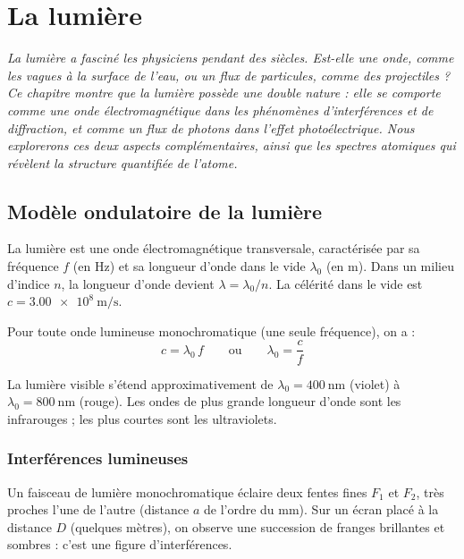 \chapter{La lumière}

\textit{La lumière a fasciné les physiciens pendant des siècles. Est-elle une onde, comme les vagues à la surface de l'eau, ou un flux de particules, comme des projectiles ? Ce chapitre montre que la lumière possède une double nature : elle se comporte comme une onde électromagnétique dans les phénomènes d'interférences et de diffraction, et comme un flux de photons dans l'effet photoélectrique. Nous explorerons ces deux aspects complémentaires, ainsi que les spectres atomiques qui révèlent la structure quantifiée de l'atome.}

\section{Modèle ondulatoire de la lumière}

\begin{definition}
La lumière est une onde électromagnétique transversale, caractérisée par sa fréquence \(f\) (en \si{\hertz}) et sa longueur d'onde dans le vide \(\lambda_0\) (en \si{\metre}). Dans un milieu d'indice \(n\), la longueur d'onde devient \(\lambda = \lambda_0 / n\). La célérité dans le vide est \(c = \SI{3.00e8}{\metre\per\second}\).
\end{definition}

\begin{loi}
Pour toute onde lumineuse monochromatique (une seule fréquence), on a :
\[
c = \lambda_0 \, f \qquad\text{ou}\qquad \lambda_0 = \frac{c}{f}
\]
\end{loi}

\begin{remarque}
La lumière visible s'étend approximativement de \(\lambda_0 = \SI{400}{\nano\metre}\) (violet) à \(\lambda_0 = \SI{800}{\nano\metre}\) (rouge). Les ondes de plus grande longueur d'onde sont les infrarouges ; les plus courtes sont les ultraviolets.
\end{remarque}

\subsection{Interférences lumineuses}

\begin{experience}
Un faisceau de lumière monochromatique éclaire deux fentes fines \(F_1\) et \(F_2\), très proches l'une de l'autre (distance \(a\) de l'ordre du \si{\milli\metre}). Sur un écran placé à la distance \(D\) (quelques mètres), on observe une succession de franges brillantes et sombres : c'est une figure d'interférences.
\end{experience}

